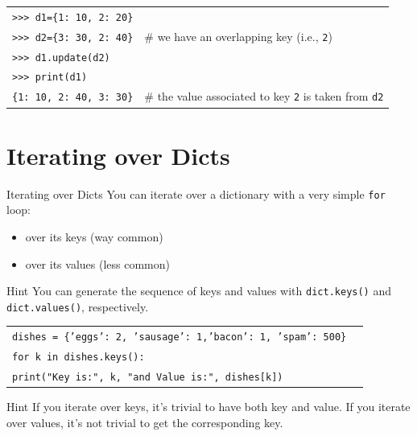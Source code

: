\documentclass[t,handout,9pt]{beamer}
\begin{document}
\begin{frame}
\begin{table}[]
\begin{flushleft}
\begin{tabular}{ll}
\texttt{>{}>{}> d1=\{1: 10, 2: 20\}} &   \\
\texttt{>{}>{}> d2=\{3: 30, 2: 40\}} &  \# we have an overlapping key (i.e., \texttt{2}) \\
\texttt{>{}>{}> d1.update(d2)} &   \\
\texttt{>{}>{}> print(d1)} &   \\
\texttt{\{1: 10, 2: 40, 3: 30\}} & \# the value associated to key \texttt{2} is taken from \texttt{d2} \\
\end{tabular}
\end{flushleft}
\end{table}
\vfill
\end{frame}
\section{Iterating over Dicts}
\begin{frame}{Iterating over Dicts}
You can iterate over a dictionary with a very simple \texttt{for} loop:
\begin{itemize}
	\item over its keys (way common)
	\item over its values (less common)
\end{itemize}
\begin{block}{Hint}
You can generate the sequence of keys and values with \texttt{dict.keys()} and \texttt{dict.values()}, respectively.
\end{block}
\begin{table}[]
\begin{flushleft}
\begin{tabular}{ll}
\texttt{dishes = \{'eggs': 2, 'sausage': 1,'bacon': 1, 'spam': 500\}} &   \\
\texttt{for k in dishes.keys():} &   \\
\texttt{\qquad print("Key is:", k, "and Value is:", dishes[k])} &   \\
\end{tabular}
\end{flushleft}
\end{table}
\begin{block}{Hint}
If you iterate over keys, it's trivial to have both key and value. If you iterate over values, it's not trivial to get the corresponding key.
\end{block}
\end{frame}
%
\end{document}
